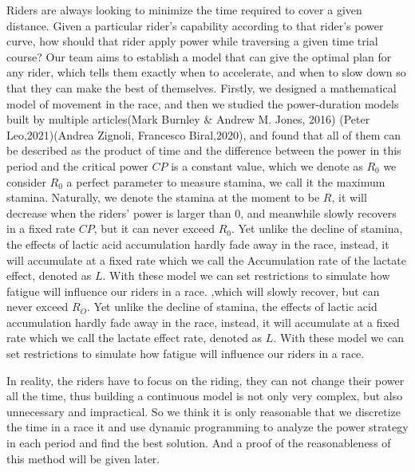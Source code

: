 \documentclass[12pt]{article}
\begin{document}
Riders are always looking to minimize the time required to cover a given distance. Given a
particular rider's capability according to that rider's power curve, how should that rider apply
power while traversing a given time trial course?
Our team aims to establish a model that can give the optimal plan for any  rider, which tells them exactly when to accelerate,
and when to slow down so that they can make the best of themselves. Firstly, we designed a mathematical model of movement in the race, and then we studied the power-duration models built by multiple articles(Mark Burnley \& Andrew M. Jones, 2016)\cite{doi:10.1080/17461391.2016.1249524}
(Peter Leo,2021)\cite{leo2021power}(Andrea Zignoli, Francesco Biral,2020)\cite{zignoli2020prediction}, and found that all of them can be described as the product of time and the difference
between the power in this period and the critical power $CP$ is a constant value, which we denote as $R_0$ we consider $R_0$ a perfect parameter to measure stamina, we call
it the maximum stamina. Naturally, we denote the stamina at the moment to be $R$, it
will decrease when the riders' power is larger than 0, and meanwhile slowly recovers in a fixed rate $CP$,
but it can never exceed $R_0$. Yet unlike the decline of stamina, the effects of lactic acid accumulation hardly fade away in the race, instead,
it will accumulate at a fixed rate which we call the Accumulation rate of the lactate effect, denoted as $L$. With these model we can set restrictions
to simulate how fatigue will influence our riders in a race.
,which will slowly recover, but can never exceed $R_O$. Yet unlike the decline of stamina, the effects of lactic acid accumulation hardly fade away
in the race, instead, it will accumulate at a fixed rate which we call the lactate effect rate, denoted as $L$. With these model we can set restrictions
to simulate how fatigue will influence our riders in a race.

In reality, the riders have to focus on the riding, they can not change their power all the time, thus building a continuous model is not only very complex, but also unnecessary and impractical.
So we think it is only reasonable that we discretize the time in a race  it and use dynamic programming to analyze the power strategy in each period and find the best solution. And a proof of
the reasonableness of this method will be given later.
\end{document}
